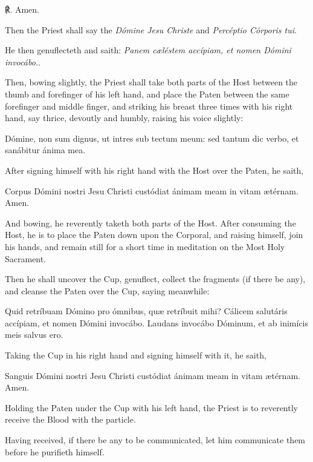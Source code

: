 ℟. Amen.
\begin{multicols}{2}
\begin{rubric}
    Then the Priest shall say the \emph{Dómine Jesu Christe} and \emph{Percéptio Córporis tui}.
\end{rubric}
\begin{rubric}
    He then genuflecteth and saith: \emph{Panem cæléstem accípiam, et nomen Dómini invocábo.}.
\end{rubric}
\begin{rubric}
    Then, bowing slightly, the Priest shall take both parts of the Host between the thumb and forefinger of his left hand, and place the Paten between the same forefinger and middle finger, and striking his breast three times with his right hand, say thrice, devoutly and humbly, raising his voice slightly:
\end{rubric}\par\noindent
    Dómine, non sum dignus,  ut intres sub tectum meum: sed tantum dic verbo, et sanábitur ánima mea.
\begin{rubric}
After signing himself with his right hand with the Host over the Paten, he saith,
\end{rubric}\par\noindent
Corpus Dómini nostri Jesu Christi custódiat ánimam meam in vitam ætérnam. Amen.
\begin{rubric}
And bowing, he reverently taketh both parts of the Host. After consuming the Host, he is to place the Paten down upon the Corporal, and raising himself, join his hands, and remain still for a short time in meditation on the Most Holy Sacrament.
\end{rubric}
\begin{rubric}
	Then he shall uncover the Cup, genuflect, collect the fragments (if there be any), and cleanse the Paten over the Cup, saying meanwhile:
\end{rubric}
\par\noindent
Quid retríbuam Dómino pro ómnibus, quæ retríbuit mihi? Cálicem salutáris accípiam, et nomen Dómini invocábo. Laudans invocábo Dóminum, et ab inimícis meis salvus ero.
\begin{rubric}
    Taking the Cup in his right hand and signing himself with it, he saith,
\end{rubric}\par\noindent
Sanguis Dómini nostri Jesu Christi custódiat ánimam meam in vitam ætérnam. Amen.
\begin{rubric}
    Holding the Paten under the Cup with his left hand, the Priest is to reverently receive the Blood with the particle.
\end{rubric}
\begin{rubric}
	Having received, if there be any to be communicated, let him communicate them before he purifieth himself.
\end{rubric}
\end{multicols}
